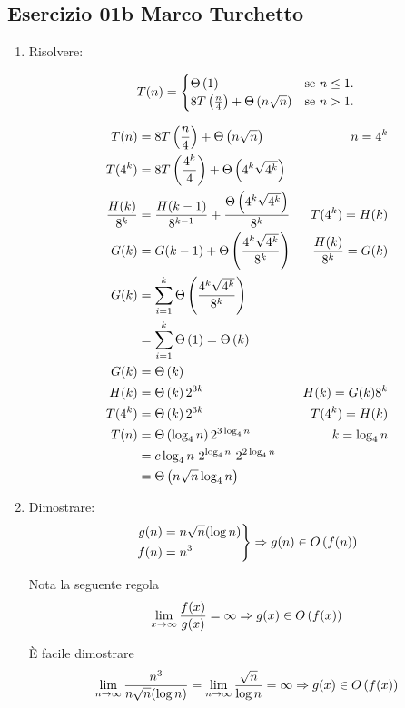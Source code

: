 
\subsection[01b MT]{Esercizio 01b Marco Turchetto}
\begin{enumerate}[label=\alph*)]
\item Risolvere:

\begin{equation}
	T(n)=\begin{cases}
		\Theta\left(1\right)							            & \text{se $n \leq 1$}.\\
		\text{$8T\left( \frac{n}{4} \right) + \Theta\left(n \sqrt{n}\right) $} & \text{se $n > 1$}.
 	\end{cases}
\end{equation}

\begin{align*}
	T(n) &= 8T\left(\frac{n}{4}\right) + \Theta\left( n \sqrt{n}\right)  & n = 4^k \\
	T(4^k) &= 8T\left(\frac{4^k}{4}\right) + \Theta\left(4^k \sqrt{4^k}\right) \\
	\frac{H(k)}{8^k} &= \frac{H(k-1)}{8^{k-1}} + \frac{\Theta\left(4^k \sqrt{4^k}\right)}{8^k} & T(4^k) = H(k) \\
	G(k) &= G(k-1) + \Theta\left(\frac{4^k \sqrt{4^k}}{8^k}\right) & \frac{H(k)}{8^k} = G(k)\\
	G(k) &= \sum _{i=1} ^{k} \Theta\left(\frac{4^k \sqrt{4^k}}{8^k}\right) \\
	     &= \sum _{i=1} ^{k} \Theta\left(1\right) = \Theta\left(k\right) \\
	G(k) &= \Theta\left(k\right) \\
	H(k) &= \Theta\left(k\right) 2^{3k} & H(k) = G(k) 8^k\\
	T(4^k) &= \Theta\left(k\right) 2^{3k} & T(4^k) = H(k) \\
	T(n) &= \Theta\left(\log _4 n\right) 2^{3 \log_4 n} & k= \log_4 n \\ 
	     &= c \log _4 n \ 2^{\log_4 n} \ 2 ^ {2 \log _ 4 n} \\
	     &= \Theta\left(n \sqrt{n} \log_4 n\right)
\end{align*}

\item Dimostrare:
\begin{equation*}
\left.
	\begin{aligned}
		g(n) &= n \sqrt{n}(\log n) \\
		f(n) &= n^3
	\end{aligned}
\right \} \Rightarrow  g(n) \in O\left(f(n)\right) 
\end{equation*}

Nota la seguente regola
\begin{equation*}
	\lim _{x \to \infty} \frac{f(x)}{g(x)} = \infty \Rightarrow g(x) \in O\left(f(x)\right)
\end{equation*}

\`{E} facile dimostrare
\begin{align*}
	\lim _{n \to \infty} \frac{n^3}{n \sqrt{n}(\log n)} = \lim _{n \to \infty} \frac{\sqrt{n}}{ \log n} = \infty \Rightarrow g(x) \in O\left(f(x)\right)
\end{align*}
\end{enumerate}
